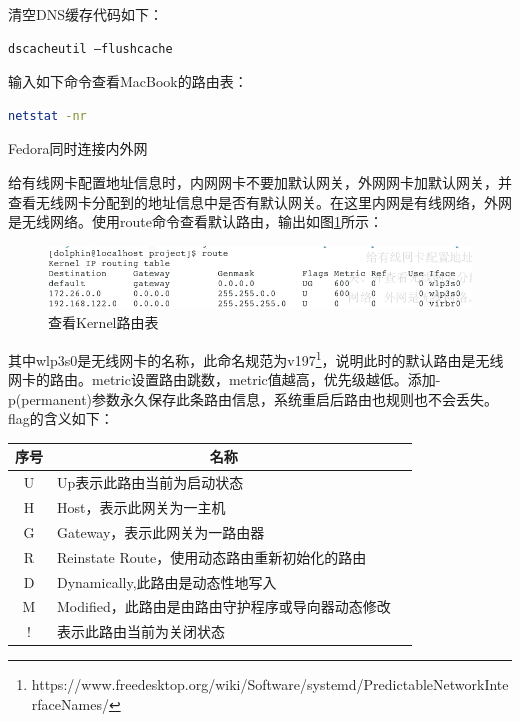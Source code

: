 \documentclass[11pt,fleqn]{book}
\makeatletter
\numberwithin{dummy}{section}
\theoremstyle{ocrenumbox}
\theoremstyle{blacknumex}
\theoremstyle{blacknumbox}
\theoremstyle{ocrenum}
\renewcommand{\subsubsection}{\@startsection {subsubsection}{3}{\z@}
	{-2ex \@plus -0.1ex \@minus -.2ex}
	{.2ex \@plus.2ex }
	{\normalfont\small\sffamily\bfseries}}
\makeatother
\begin{document}
清空DNS缓存代码如下：

\begin{lstlisting}[language=Bash]
dscacheutil –flushcache
\end{lstlisting}

输入如下命令查看MacBook的路由表：

\begin{lstlisting}[language=Bash]
netstat -nr
\end{lstlisting}

\subsubsection{Fedora同时连接内外网}

给有线网卡配置地址信息时，内网网卡不要加默认网关，外网网卡加默认网关，并查看无线网卡分配到的地址信息中是否有默认网关。在这里内网是有线网络，外网是无线网络。使用route命令查看默认路由，输出如图\ref{fig:routetable}所示：

\begin{figure}[htbp]
	\centering
	\includegraphics[scale=0.4]{route-table.jpg}
	\caption{查看Kernel路由表}
	\label{fig:routetable}
\end{figure}

其中wlp3s0是无线网卡的名称，此命名规范为v197\footnote{https://www.freedesktop.org/wiki/Software/systemd/PredictableNetworkInterfaceNames/}，说明此时的默认路由是无线网卡的路由。metric设置路由跳数，metric值越高，优先级越低。添加-p(permanent)参数永久保存此条路由信息，系统重启后路由也规则也不会丢失。flag的含义如下：

\begin{tabular}{cp{10cm}c}
	\hline
	\multirow{1}{*}{序号}
	& \multicolumn{1}{c}{名称}  \\
	\hline			
	U  & Up表示此路由当前为启动状态 \\	
	H & Host，表示此网关为一主机 \\
	G & Gateway，表示此网关为一路由器\\
	R & Reinstate Route，使用动态路由重新初始化的路由\\
	D & Dynamically,此路由是动态性地写入\\
	M & Modified，此路由是由路由守护程序或导向器动态修改\\
	! & 表示此路由当前为关闭状态\\
	\hline
\end{tabular}
\end{document}
